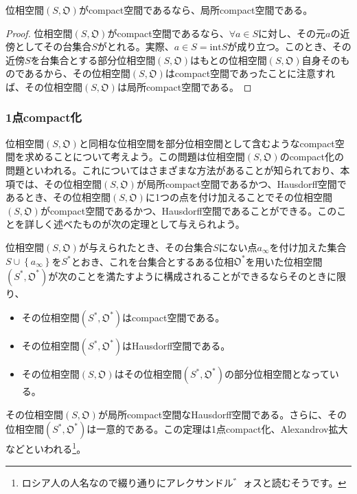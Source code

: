 \documentclass[dvipdfmx]{jsarticle}
\begin{document}
\begin{thm}\label{8.1.6.14}
位相空間$\left( S,\mathfrak{O} \right)$がcompact空間であるなら、局所compact空間である。
\end{thm}
\begin{proof}
位相空間$\left( S,\mathfrak{O} \right)$がcompact空間であるなら、$\forall a \in S$に対し、その元$a$の近傍としてその台集合$S$がとれる。実際、$a \in S = {\mathrm{int}}S$が成り立つ。このとき、その近傍$S$を台集合とする部分位相空間$\left( S,\mathfrak{O} \right)$はもとの位相空間$\left( S,\mathfrak{O} \right)$自身そのものであるから、その位相空間$\left( S,\mathfrak{O} \right)$はcompact空間であったことに注意すれば、その位相空間$\left( S,\mathfrak{O} \right)$は局所compact空間である。
\end{proof}
\subsubsection{1点compact化}%
位相空間$\left( S,\mathfrak{O} \right)$と同相な位相空間を部分位相空間として含むようなcompact空間を求めることについて考えよう。この問題は位相空間$\left( S,\mathfrak{O} \right)$のcompact化の問題といわれる。これについてはさまざまな方法があることが知られており、本項では、その位相空間$\left( S,\mathfrak{O} \right)$が局所compact空間であるかつ、Hausdorff空間であるとき、その位相空間$\left( S,\mathfrak{O} \right)$に1つの点を付け加えることでその位相空間$\left( S,\mathfrak{O} \right)$がcompact空間であるかつ、Hausdorff空間であることができる。このことを詳しく述べたものが次の定理として与えられよう。
\begin{thm}\label{8.1.6.15}
位相空間$\left( S,\mathfrak{O} \right)$が与えられたとき、その台集合$S$にない点$a_{\infty}$を付け加えた集合$S \cup \left\{ a_{\infty} \right\}$を$S^{*}$とおき、これを台集合とするある位相$\mathfrak{O}^{*}$を用いた位相空間$\left( S^{*},\mathfrak{O}^{*} \right)$が次のことを満たすように構成されることができるならそのときに限り、
\begin{itemize}
\item
  その位相空間$\left( S^{*},\mathfrak{O}^{*} \right)$はcompact空間である。
\item
  その位相空間$\left( S^{*},\mathfrak{O}^{*} \right)$はHausdorff空間である。
\item
  その位相空間$\left( S,\mathfrak{O} \right)$はその位相空間$\left( S^{*},\mathfrak{O}^{*} \right)$の部分位相空間となっている。
\end{itemize}
その位相空間$\left( S,\mathfrak{O} \right)$が局所compact空間なHausdorff空間である。さらに、その位相空間$\left( S^{*},\mathfrak{O}^{*} \right)$は一意的である。この定理は1点compact化、Alexandrov拡大などといわれる\footnote{ロシア人の人名なので綴り通りにアレクサンドル゛ォスと読むそうです。}。
\end{thm}\par
\end{document}
